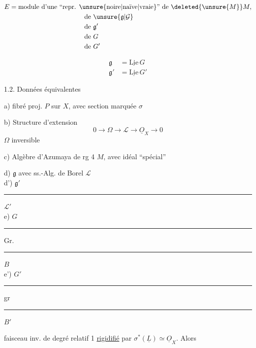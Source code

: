 
\[ \begin{aligned}
 E&=\text{module d'une ``repr. \unsure{noire|naïve|vraie}'' de }\deleted{\unsure{M}}M,\\
 &\hspace{4cm}\text{de }\unsure{\mathfrak g|\mathcal G}\\&\hspace{4cm}\text{de }\mathfrak g'\\
 &\hspace{4cm}\text{de }G\\&\hspace{4cm}\text{de }G'
 \end{aligned} \]

\[ \begin{aligned}\mathfrak g&=\underline{\mathrm{Lie}}\,G\\ \mathfrak g'&=\underline{\mathrm{Lie}}\,G'\end{aligned} \]

1.2. Données équivalentes

a) fibré  proj. $P$ sur $X$, avec section marquée $\sigma$

b) Structure d'extension
\[ 0\longrightarrow\Omega\longrightarrow\mathscr L\longrightarrow\underline O_X\longrightarrow0 \]
$\Omega$ inversible

c) Algèbre d'Azumaya de rg 4 $M$, avec idéal ``spécial''  

d) $\mathfrak g$ avec ss.-Alg. de Borel $\mathscr L$\\
d') $\mathfrak g'$ \rule{4cm}{0.3pt} $\mathscr L'$\\
e) $G$ \rule{2cm}{0.3pt} Gr. \rule{1.5cm}{0.3pt} $B$\\
e') $G'$ \rule{2cm}{0.3pt} gr \rule{1.5cm}{0.3pt} $B'$



 faisceau inv. de degré relatif 1 \uline{rigidifié} par $\sigma^*(\underline L)\simeq\underline O_X$. Alors

